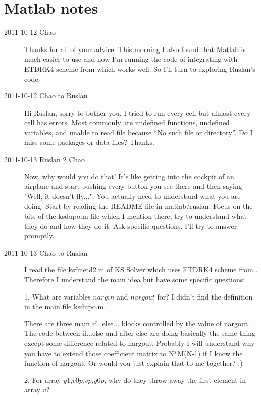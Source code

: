 \section{Matlab notes}
\label{s:matlab}

\begin{description}

\item[2011-10-12 Chao]
Thanks for all of your advice. This morning I also found that Matlab is
much easier to use and now I'm running the code of integrating \KSe  with
ETDRK4 scheme from  which works well. So I'll turn to
exploring Ruslan's code.


\item[2011-10-12 Chao to Ruslan]
Hi Ruslan, sorry to bother you. I tried to run every cell but almost every cell has errors. Most commonly are undefined functions, undefined variables, and unable to read file because ``No such file or directory''. Do I miss some packages or data files? Thanks.

\item[2011-10-13 Ruslan 2 Chao]  Now, why would you do that!  It's like getting into the cockpit of an airplane and start pushing every button you see there and then saying "Well, it doesn't fly...".  You actually need to understand what you are doing.  Start by reading the README file in matlab/ruslan.  Focus on the bits of the ksdupo.m file which I mention there, try to understand what they do and how they do it.  Ask specific questions.  I'll try to answer promptly.

\item[2011-10-13 Chao to Ruslan] I read the file ksfmetd2.m of KS Solver which uses ETDRK4 scheme from . Therefore I understand the main idea but have some specific questions:

1, What are variables $\textit{nargin}$ and $\textit{nargout}$ for? I didn't find the definition in the main file ksdupo.m.

   There are three main if...else... blocks controlled by the value of nargout. The code between if...else and after else are doing basically the same thing except some difference related to nargout. Probably I will understand why you have to extend those coefficient matrix to N*M(N-1) if I know the function of nargout. Or would you just explain that to me together? :)

2, For array $\textit{y1,v0p,vp,y0p}$, why do they throw away the first element in array $\textit{v}$?


\end{description}
